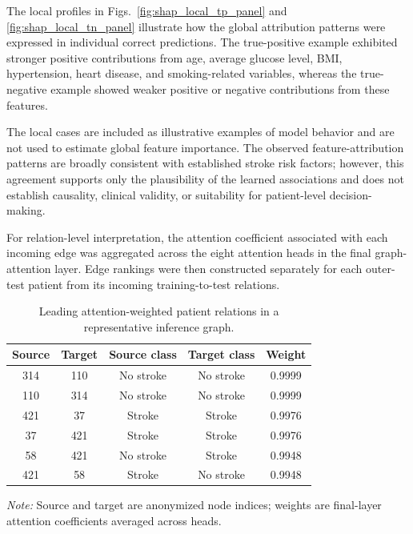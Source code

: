 \documentclass[pdflatex,sn-mathphys-num]{sn-jnl}%
\theoremstyle{thmstyleone}%
\theoremstyle{thmstyletwo}%
\theoremstyle{thmstylethree}%
\begin{document}
The local profiles in Figs.~\ref{fig:shap_local_tp_panel} and
\ref{fig:shap_local_tn_panel} illustrate how the global attribution patterns
were expressed in individual correct predictions. The true-positive example
exhibited stronger positive contributions from age, average glucose level,
BMI, hypertension, heart disease, and smoking-related variables, whereas the
true-negative example showed weaker positive or negative contributions from
these features.

 {
The local cases are included as illustrative examples of model behavior and
are not used to estimate global feature importance. The observed
feature-attribution patterns are broadly consistent with established stroke
risk factors; however, this agreement supports only the plausibility of the
learned associations and does not establish causality, clinical validity, or
suitability for patient-level decision-making.
}

 {
For relation-level interpretation, the attention coefficient associated with
each incoming edge was aggregated across the eight attention heads in the
final graph-attention layer. Edge rankings were then constructed separately
for each outer-test patient from its incoming training-to-test relations.
}

\begin{table}[!ht]
\centering
\caption{
Leading attention-weighted patient relations in a representative inference
graph.
}
\label{tab:top_attention_relations}
\small
\setlength{\tabcolsep}{4pt}
\renewcommand{\arraystretch}{1.06}
\begin{tabular}{@{}ccccc@{}}
\toprule
\textbf{Source} &
\textbf{Target} &
\textbf{Source class} &
\textbf{Target class} &
\textbf{Weight} \\
\midrule
314 & 110 & No stroke & No stroke & 0.9999 \\
110 & 314 & No stroke & No stroke & 0.9999 \\
421 & 37  & Stroke    & Stroke    & 0.9976 \\
37  & 421 & Stroke    & Stroke    & 0.9976 \\
58  & 421 & No stroke & Stroke    & 0.9948 \\
421 & 58  & Stroke    & No stroke & 0.9948 \\
\bottomrule
\end{tabular}

\vspace{2pt}
\begin{minipage}{0.94\linewidth}
\footnotesize
\textit{Note:} Source and target are anonymized node indices; weights are
final-layer attention coefficients averaged across heads.
\end{minipage}
\end{table}
\end{document}
